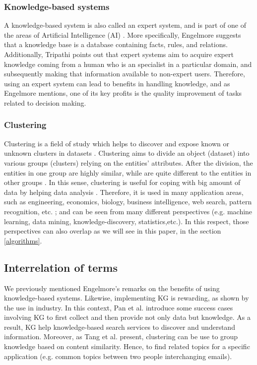 \documentclass[runningheads]{llncs}
\begin{document}
\subsubsection{Knowledge-based systems} \label{knowledge-based}
A knowledge-based system is also called an expert system, and is part of one of the areas of Artificial Intelligence (AI) \cite{Tripathi}. More specifically, Engelmore \cite{Engelmore} suggests that a knowledge base is a database containing facts, rules, and relations. Additionally, Tripathi \cite{Tripathi} points out that expert systems aim to acquire expert knowledge coming from a human who is an specialist in a particular domain, and subsequently making that information available to non-expert users.
Therefore, using an expert system can lead to benefits in handling knowledge, and as Engelmore \cite{Engelmore} mentions, one of its key profits is the quality improvement of tasks related to decision making.


\subsubsection{Clustering} \label{clustering}
Clustering is a field of study which helps to discover and expose known or unknown clusters in datasets \cite{Han} \cite{Mirkin}. Clustering aims to divide an object (dataset) into various groups (clusters) relying on the entities' attributes. After the division, the entities in one group are highly similar, while are quite different to the entities in other groups \cite{Han}. In this sense, clustering is useful for coping with big amount of data by helping data analysis \cite{Pedrycz} \cite{Mirkin}. Therefore, it is used in many application areas, such as engineering, economics, biology, business intelligence, web search, pattern recognition, etc. \cite{Pedrycz} \cite{Han}; and can be seen from many different perspectives (e.g. machine learning, data mining, knowledge-discovery, statistics,etc.). In this respect, those perspectives can also overlap as we will see in this paper, in the section \ref{algorithms}.


\subsection{Interrelation of terms} \label{interrelation}
We previously mentioned Engelmore's remarks on the benefits of using knowledge-based systems. Likewise, implementing KG is 
rewarding, as shown by the use in industry. In this context, Pan et al. \cite{Pan} introduce some success cases involving KG to first collect and then provide not only data but knowledge. As a result, KG help knowledge-based search services to discover and understand information. Moreover, as Tang et al. \cite{Tang} present, clustering can be use to group knowledge based on content similarity. Hence, to find related topics for a specific application (e.g. common topics between two people interchanging emails).
\end{document}
